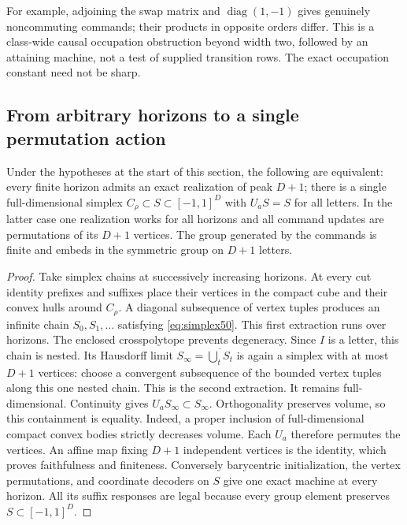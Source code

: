 For example, adjoining the swap matrix and
$\operatorname{diag}(1,-1)$ gives genuinely noncommuting commands; their
products in opposite orders differ. This is a class-wide causal
occupation obstruction beyond width two, followed by an attaining
machine, not a test of supplied transition rows. The exact occupation
constant need not be sharp.

\subsection{From arbitrary horizons to a single permutation action}
\begin{theorem}\label{thm:allhorizon50}
Under the hypotheses at the start of this section, the following are
equivalent: every finite horizon admits an exact realization of peak
$D+1$; there is a single full-dimensional simplex
$C_\rho\subset S\subset[-1,1]^D$ with $U_aS=S$ for all letters.
In the latter case one realization works for all horizons and all
command updates are permutations of its $D+1$ vertices. The group
generated by the commands is finite and embeds in the symmetric group
on $D+1$ letters.
\end{theorem}
\begin{proof}
Take simplex chains at successively increasing horizons. At every cut
identity prefixes and suffixes place their vertices in the compact
cube and their convex hulls around $C_\rho$. A diagonal subsequence of
vertex tuples produces an infinite chain $S_0,S_1,\ldots$ satisfying
\eqref{eq:simplex50}. This first extraction runs over horizons. The enclosed crosspolytope prevents degeneracy.
Since $I$ is a letter, this chain is nested. Its Hausdorff limit
$S_\infty=\overline{\bigcup_t S_t}$ is again a simplex with at most
$D+1$ vertices: choose a convergent subsequence of the bounded vertex
tuples along this one nested chain. This is the second extraction. It remains full-dimensional. Continuity gives
$U_aS_\infty\subset S_\infty$. Orthogonality preserves volume, so this
containment is equality. Indeed, a proper inclusion of full-dimensional
compact convex bodies strictly decreases volume. Each $U_a$ therefore
permutes the vertices. An affine map fixing $D+1$ independent vertices
is the identity, which proves faithfulness and finiteness.
Conversely barycentric initialization, the vertex permutations, and
coordinate decoders on $S$ give one exact machine at every horizon.
All its suffix responses are legal because every group element
preserves $S\subset[-1,1]^D$.
\end{proof}

